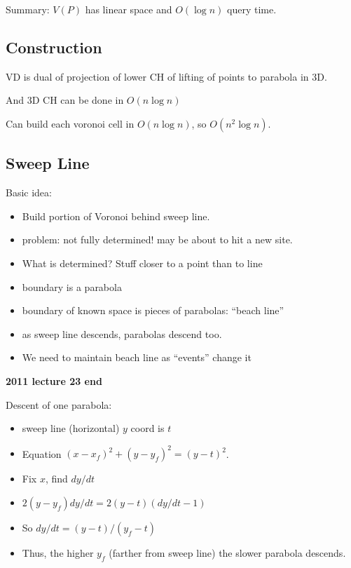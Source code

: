 \documentclass{article}
\begin{document}
Summary: $V(P)$ has linear space and $O(\log n)$ query time.

\subsection{Construction}

VD is dual of projection of lower CH of lifting of points to parabola in 3D.

And 3D CH can be done in $O(n\log n)$

Can build each voronoi cell in $O(n\log n)$, so $O(n^2\log n)$.

\subsection{Sweep Line}

Basic idea:
\begin{itemize}
\item Build portion of Voronoi behind sweep line.
\item problem: not fully determined!  may be about to hit a new site.
\item What is determined?  Stuff closer to a point than to line
\item boundary is a parabola
\item boundary of known space is pieces of parabolas: ``beach line''
\item as sweep line descends, parabolas descend too. 
\item We need to maintain beach line as ``events'' change it
\end{itemize}

\textbf{ 2011 lecture 23 end}

Descent of one parabola:
\begin{itemize}
\item sweep line (horizontal) $y$ coord is $t$
\item Equation $(x-x_f)^2+(y-y_f)^2 = (y-t)^2$.
\item Fix $x$, find $dy/dt$
\item $2(y-y_f)dy/dt = 2(y-t)(dy/dt-1)$
\item So $dy/dt=(y-t)/(y_f-t)$
\item Thus, the higher $y_f$ (farther from sweep line) the slower
  parabola descends.
\end{itemize}
\end{document}
